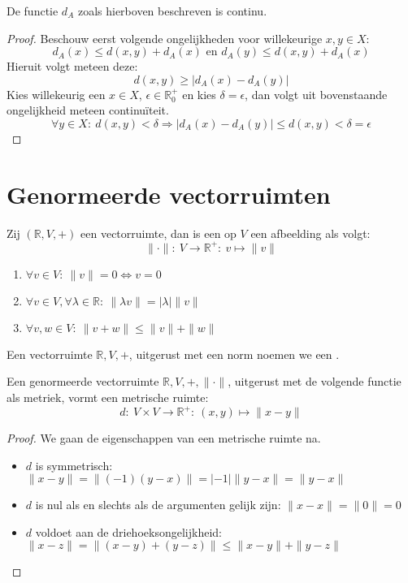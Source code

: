 \documentclass[main.tex]{subfiles}
\begin{document}
\begin{st}
  De functie $d_{A}$ zoals hierboven beschreven is continu.
  
  \begin{proof}
    Beschouw eerst volgende ongelijkheden voor willekeurige $x,y\in X$:
    \[ d_{A}(x) \le d(x,y) + d_{A}(x) \text{ en } d_{A}(y) \le d(x,y) + d_{A}(x) \]
    Hieruit volgt meteen deze:
    \[ d(x,y) \ge |d_{A}(x)-d_{A}(y)| \]
    Kies willekeurig een $x\in X$, $\epsilon \in \mathbb{R}_{0}^{+}$ en kies $\delta = \epsilon$, dan volgt uit bovenstaande ongelijkheid meteen continu\"iteit.
    \[ \forall y\in X:\ d(x,y) < \delta \Rightarrow |d_{A}(x)-d_{A}(y)| \le d(x,y) < \delta = \epsilon \]
    \feed
  \end{proof}
\end{st}


\section{Genormeerde vectorruimten}
\label{sec:genorm-vect}

\begin{de}
  \label{de:norm}
  Zij $(\mathbb{R},V,+)$ een vectorruimte, dan is een  op $V$ een afbeelding als volgt:
  \[ \|\cdot\|:\ V \rightarrow \mathbb{R}^{+}:\ v \mapsto \|v\| \]
  \begin{enumerate}
  \item $\forall v\in V:\ \|v\| = 0 \Leftrightarrow v=0$
  \item $\forall v\in V, \forall \lambda \in \mathbb{R}:\ \|\lambda v\| = |\lambda|\|v\|$
  \item $\forall v,w\in V:\ \|v+w\| \le \|v\| + \|w\|$
  \end{enumerate}
\end{de}

\begin{de}
  Een vectorruimte $\mathbb{R},V,+$, uitgerust met een norm noemen we een .
\end{de}

\begin{st}
  Een genormeerde vectorruimte $\mathbb{R},V,+,\|\cdot\|$, uitgerust met de volgende functie als metriek, vormt een metrische ruimte:
  \[ d:\ V \times V \rightarrow \mathbb{R}^{+}:\ (x,y) \mapsto \|x-y\| \]

  \begin{proof}
    We gaan de eigenschappen van een metrische ruimte na.
    \begin{itemize}
    \item $d$ is symmetrisch: $\|x-y\| = \|(-1)(y-x)\| = |-1|\|y-x\| = \|y-x\|$
    \item $d$ is nul als en slechts als de argumenten gelijk zijn: $\|x-x\| = \|0\| = 0$
    \item $d$ voldoet aan de driehoeksongelijkheid: $\| x-z \| = \| (x-y)+(y-z) \| \le \|x-y\| + \| y-z \|$
    \end{itemize}
  \end{proof}
\end{st}
\end{document}
